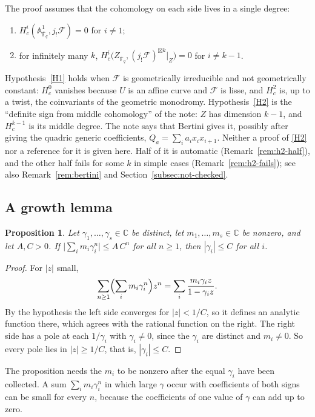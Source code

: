 \documentclass[11pt]{amsbook}
\theoremstyle{plain}
\newtheorem{proposition}[theorem]{Proposition}
\theoremstyle{definition}
\theoremstyle{remark}
\numberwithin{equation}{section}
\numberwithin{figure}{chapter}
\numberwithin{table}{chapter}
\renewcommand{\C}{\mathbb{C}}
\newcommand{\F}{\mathbb{F}}
\newcommand{\Fb}{\overline{\F}_q}
\newcommand{\cF}{\mathcal{F}}
\begin{document}
The proof assumes that the cohomology on each side lives in a
single degree:
\begin{enumerate}[label=(H\arabic*)]
\item\label{H1} $H^i_c(\mathbb{A}^1_{\Fb}, j_!\cF) = 0$ for
  $i \ne 1$;
\item\label{H2} for infinitely many $k$,
  $H^i_c\bigl(Z_{\Fb}, (j_!\cF)^{\boxtimes k}|_Z\bigr) = 0$ for
  $i \ne k - 1$.
\end{enumerate}
Hypothesis~\ref{H1} holds when $\cF$ is geometrically irreducible
and not geometrically constant: $H^0_c$ vanishes because $U$ is an
affine curve and $\cF$ is lisse, and $H^2_c$ is, up to a twist, the
coinvariants of the geometric monodromy. Hypothesis~\ref{H2} is the
``definite sign from middle cohomology'' of the note: $Z$ has
dimension $k-1$, and $H^{k-1}_c$ is its middle degree. The note
says that Bertini gives it, possibly after giving the quadric
generic coefficients, $Q_a = \sum_i a_i x_ix_{i+1}$. Neither a
proof of \ref{H2} nor a reference for it is given here. Half of it
is automatic (Remark~\ref{rem:h2-half}), and the other half fails
for some $k$ in simple cases (Remark~\ref{rem:h2-fails}); see also
Remark~\ref{rem:bertini} and Section~\ref{subsec:not-checked}.

\subsection{A growth lemma}

\begin{proposition}\label{lem:growth}
Let $\gamma_1, \dots, \gamma_s \in \C$ be distinct, let
$m_1, \dots, m_s \in \C$ be nonzero, and let $A,C>0$. If
$\bigl|\sum_i m_i\gamma_i^n\bigr| \le A\,C^n$ for all $n \ge 1$,
then $|\gamma_i| \le C$ for all $i$.
\end{proposition}

\begin{proof}
For $|z|$ small,
\[
  \sum_{n\ge1}\Bigl(\sum_i m_i\gamma_i^n\Bigr) z^n
  = \sum_i \frac{m_i\gamma_i z}{1 - \gamma_i z}.
\]
By the hypothesis the left side converges for $|z| < 1/C$, so it
defines an analytic function there, which agrees with the rational
function on the right. The right side has a pole at each
$1/\gamma_i$ with $\gamma_i \ne 0$, since the $\gamma_i$ are
distinct and $m_i \ne 0$. So every pole lies in $|z| \ge 1/C$,
that is, $|\gamma_i| \le C$.
\end{proof}

The proposition needs the $m_i$ to be nonzero after the equal
$\gamma_i$ have been collected. A sum
$\sum_i m_i\gamma_i^n$ in which large $\gamma$ occur with
coefficients of both signs can be small for every $n$, because the
coefficients of one value of $\gamma$ can add up to zero.
\end{document}
